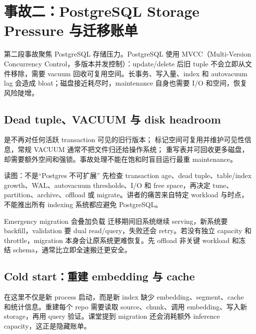 \section{事故二：PostgreSQL Storage Pressure 与迁移账单}

第二段事故聚焦 PostgreSQL 存储压力。PostgreSQL 使用 MVCC（Multi-Version Concurrency Control，多版本并发控制）：update/delete 后旧 tuple 不会立即从文件移除，需要 vacuum 回收可复用空间。长事务、写入量、index 和 autovacuum lag 会造成 bloat；磁盘接近耗尽时，maintenance 自身也需要 I/O 和空间，恢复风险陡增。

\subsection{Dead tuple、VACUUM 与 disk headroom}

 是不再对任何活跃 transaction 可见的旧行版本； 标记空间可复用并维护可见性信息，常规 VACUUM 通常不把文件归还给操作系统； 重写表并可回收更多磁盘，却需要额外空间和强锁。事故处理不能在饱和时盲目运行最重 maintenance。


\begin{knowledgebox}{读图：不是“Postgres 不可扩展”}
先检查 transaction age、dead tuple、table/index growth、WAL、autovacuum thresholds、I/O 和 free space，再决定 tune、partition、archive、offload 或 migrate。讲者的痛苦来自特定 workload 与时点，不能推出所有 indexing 系统都应避免 PostgreSQL。
\end{knowledgebox}

\begin{warningbox}{Emergency migration 会叠加负载}
迁移期间旧系统继续 serving，新系统要 backfill，validation 要 dual read/query，失败还会 retry。若没有独立 capacity 和 throttle，migration 本身会让原系统更难恢复。先 offload 非关键 workload 和冻结 schema，通常比立即全速搬迁更安全。
\end{warningbox}

\subsection{Cold start：重建 embedding 与 cache}

 在这里不仅是新 process 启动，而是新 index 缺少 embedding、segment、cache 和统计信息。重建每个 repo 需要读取 source、chunk、调用 embedding、写入新 storage，再用 query 验证。课堂提到 migration 还会消耗额外 inference capacity，这正是隐藏账单。

